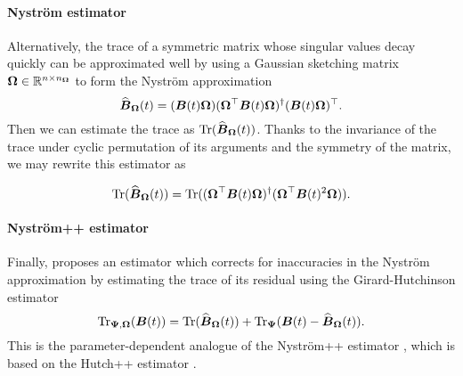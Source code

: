 \documentclass[12pt]{article}
\begin{document}
\paragraph{Nyström estimator} Alternatively, the trace of a symmetric matrix whose singular values decay quickly can be approximated well by using a Gaussian sketching matrix $\boldsymbol{\Omega} \in \mathbb{R}^{n \times n_{\boldsymbol{\Omega}}}$ to form the Nyström approximation \cite{gittens-2013-revisiting-nystrom}
\begin{equation}
    \widehat{\boldsymbol{B}}_{\boldsymbol{\Omega}}(t) = (\boldsymbol{B}(t) \boldsymbol{\Omega}) (\boldsymbol{\Omega}^{\top} \boldsymbol{B}(t) \boldsymbol{\Omega})^{\dagger} (\boldsymbol{B}(t) \boldsymbol{\Omega})^{\top}.
    \label{equ:nystrom-approximation}
\end{equation}
Then we can estimate the trace as $\operatorname{Tr}(\widehat{\boldsymbol{B}}_{\boldsymbol{\Omega}}(t))$. Thanks to the invariance of the trace under cyclic permutation of its arguments and the symmetry of the matrix, we may rewrite this estimator as

\begin{equation}
    \operatorname{Tr}(\widehat{\boldsymbol{B}}_{\boldsymbol{\Omega}}(t)) = \operatorname{Tr}( (\boldsymbol{\Omega}^{\top} \boldsymbol{B}(t) \boldsymbol{\Omega})^{\dagger} ( \boldsymbol{\Omega}^{\top} \boldsymbol{B}(t)^2 \boldsymbol{\Omega})).
    \label{equ:nystrom-trace-estimator}
\end{equation}

\paragraph{Nyström++ estimator} Finally, \cite{lin-2017-randomized-estimation} proposes an estimator which corrects for inaccuracies in the Nyström approximation  by estimating the trace of its residual using the Girard-Hutchinson estimator 
\begin{equation}
    \operatorname{Tr}_{\boldsymbol{\Psi}, \boldsymbol{\Omega}}(\boldsymbol{B}(t)) = \operatorname{Tr}(\widehat{\boldsymbol{B}}_{\boldsymbol{\Omega}}(t)) + \operatorname{Tr}_{\boldsymbol{\Psi}}(\boldsymbol{B}(t) - \widehat{\boldsymbol{B}}_{\boldsymbol{\Omega}}(t)).
    \label{equ:nystrompp-trace-estimator}
\end{equation}
This is the parameter-dependent analogue of the Nyström++ estimator \cite{persson-2022-improved-variants}, which is based on the Hutch++ estimator \cite{meyer-2021-hutch-optimal}. %
\end{document}
